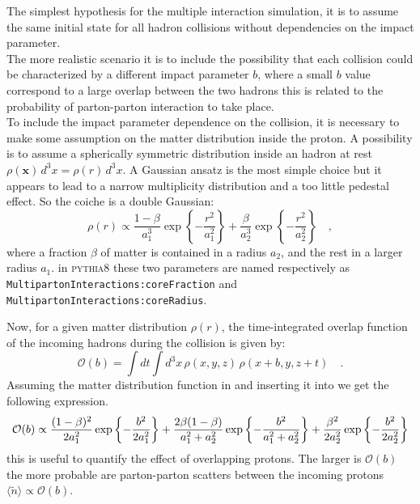 The simplest hypothesis for the multiple interaction simulation, it is to assume the same initial state for all hadron collisions without dependencies on the impact parameter. 
\\
The more realistic scenario it is to include the possibility that each collision could be characterized by a different impact parameter $b$, where a small $b$ value correspond to a large overlap between the two hadrons this is related to the probability of parton-parton interaction to take place.
\\
To include the impact parameter dependence on the collision, it is necessary to make some assumption on the matter distribution inside the proton. A possibility is to assume a spherically symmetric distribution inside an hadron at rest $\rho(\mathbf{x})\,d^3x=\rho(r)\,d^3x$. A Gaussian ansatz is the most simple choice but it appears to lead to a narrow multiplicity distribution and a too little pedestal effect. So the coiche is a double Gaussian:
\begin{equation}
	\rho(r) \propto \frac{1-\beta}{a_1^3}\exp\left\{-\frac{r^2}{a_1^2}\right\}+\frac{\beta}{a_2^3}\exp\left\{ -\frac{r^2}{a_2^2} \right\}\quad,
	\label{eq:matterDistribution}
\end{equation}
where a fraction $\beta$ of matter is contained in a radius $a_2$, and the rest in a larger radius $a_1$. in \textsc{pythia8} these two parameters are named respectively as \texttt{Multiparton}\-\texttt{Interactions:}\-\texttt{core}\-\texttt{Fraction} and \texttt{Multiparton}\-\texttt{Interactions:}\-\texttt{core}\-\texttt{Radius}.

\medskip

Now, for a given matter distribution $\rho(r)$,  the time-integrated overlap function of the incoming hadrons during the collision is given by:
\begin{equation}
	\mathcal{O}(b)=\displaystyle\int dt \displaystyle\int d^3x\,\rho(x,y,z)\,\rho(x+b,y,z+t)\quad.
	\label{eq:overlappingFunction}
\end{equation} 
Assuming the matter distribution function in  and inserting it into  we get  the following expression.
\begin{equation}
\small{
	\mathcal{O}(b)\propto \frac{(1-\beta)^2}{2a_1^2}\exp\left\{-\frac{b^2}{2a_1^2}\right\}+\frac{2\beta(1-\beta)}{a_1^2+a_2^2}\exp\left\{ -\frac{b^2}{a_1^2+a_2^2} \right\}+\frac{\beta^2}{2a_2^2}\exp\left\{-\frac{b^2}{2a_2^2}\right\}
	}
\end{equation}
this is useful to quantify the effect of overlapping protons.
The larger is $\mathcal{O}(b)$ the more probable are parton-parton scatters between the incoming protons $\langle \widetilde{n} \rangle\propto \mathcal{O}(b)$.

